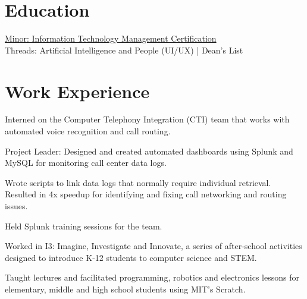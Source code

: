 \documentclass[]{deedy-resume-openfont}
\begin{document}
%
%




\section{Education}
\href{https://www.scheller.gatech.edu/degree-programs/undergraduate/courses-curriculum/curriculum-itm.html}{Minor: Information Technology Management Certification} \\
Threads: Artificial Intelligence and People (UI/UX) |  Dean's List
\sectionsep

\section{Work Experience}

\begin{tightemize}
\item Interned on the Computer Telephony Integration (CTI) team that works with automated voice recognition and call routing. 
\item Project Leader: Designed and created automated dashboards using Splunk and MySQL for monitoring call center data logs.
\item Wrote scripts to link data logs that normally require individual retrieval. Resulted in 4x speedup for identifying and fixing call networking and routing issues.
\item Held Splunk training sessions for the team.

\end{tightemize}
\sectionsep

\begin{tightemize}
\item Worked in I3: Imagine, Investigate and Innovate, a series of after-school activities designed to introduce K-12 students to computer science and STEM. 
\item Taught lectures and facilitated programming, robotics and electronics lessons for elementary, middle and high school students using MIT's Scratch.
\end{tightemize}
\sectionsep
\end{document}

